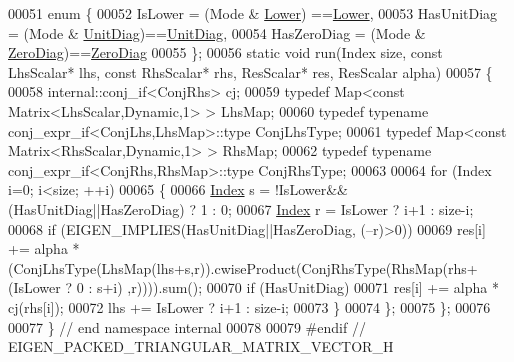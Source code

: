 \begin{DoxyCode}
00051   \textcolor{keyword}{enum} \{
00052     IsLower     = (Mode & \hyperlink{group__enums_gga39e3366ff5554d731e7dc8bb642f83cda891792b8ed394f7607ab16dd716f60e6}{Lower})   ==\hyperlink{group__enums_gga39e3366ff5554d731e7dc8bb642f83cda891792b8ed394f7607ab16dd716f60e6}{Lower},
00053     HasUnitDiag = (Mode & \hyperlink{group__enums_gga39e3366ff5554d731e7dc8bb642f83cdaddb72f888ac85d5a1c52333e54f9374b}{UnitDiag})==\hyperlink{group__enums_gga39e3366ff5554d731e7dc8bb642f83cdaddb72f888ac85d5a1c52333e54f9374b}{UnitDiag},
00054     HasZeroDiag = (Mode & \hyperlink{group__enums_gga39e3366ff5554d731e7dc8bb642f83cda884ff7240392e85aa6e4b3c957e36483}{ZeroDiag})==\hyperlink{group__enums_gga39e3366ff5554d731e7dc8bb642f83cda884ff7240392e85aa6e4b3c957e36483}{ZeroDiag}
00055   \};
00056   \textcolor{keyword}{static} \textcolor{keywordtype}{void} run(Index size, \textcolor{keyword}{const} LhsScalar* lhs, \textcolor{keyword}{const} RhsScalar* rhs, ResScalar* res, ResScalar alpha)
00057   \{
00058     internal::conj\_if<ConjRhs> cj;
00059     \textcolor{keyword}{typedef} Map<const Matrix<LhsScalar,Dynamic,1> > LhsMap;
00060     \textcolor{keyword}{typedef} \textcolor{keyword}{typename} conj\_expr\_if<ConjLhs,LhsMap>::type ConjLhsType;
00061     \textcolor{keyword}{typedef} Map<const Matrix<RhsScalar,Dynamic,1> > RhsMap;
00062     \textcolor{keyword}{typedef} \textcolor{keyword}{typename} conj\_expr\_if<ConjRhs,RhsMap>::type ConjRhsType;
00063 
00064     \textcolor{keywordflow}{for} (Index i=0; i<size; ++i)
00065     \{
00066       \hyperlink{namespace_eigen_a62e77e0933482dafde8fe197d9a2cfde}{Index} s = !IsLower&&(HasUnitDiag||HasZeroDiag) ? 1 : 0;
00067       \hyperlink{namespace_eigen_a62e77e0933482dafde8fe197d9a2cfde}{Index} r = IsLower ? i+1 : size-i;
00068       \textcolor{keywordflow}{if} (EIGEN\_IMPLIES(HasUnitDiag||HasZeroDiag, (--r)>0))
00069     res[i] += alpha * (ConjLhsType(LhsMap(lhs+s,r)).cwiseProduct(ConjRhsType(RhsMap(rhs+(IsLower ? 0 : s+i)
      ,r)))).sum();
00070       \textcolor{keywordflow}{if} (HasUnitDiag)
00071     res[i] += alpha * cj(rhs[i]);
00072       lhs += IsLower ? i+1 : size-i;
00073     \}
00074   \};
00075 \};
00076 
00077 \} \textcolor{comment}{// end namespace internal}
00078 
00079 \textcolor{preprocessor}{#endif // EIGEN\_PACKED\_TRIANGULAR\_MATRIX\_VECTOR\_H}
\end{DoxyCode}
